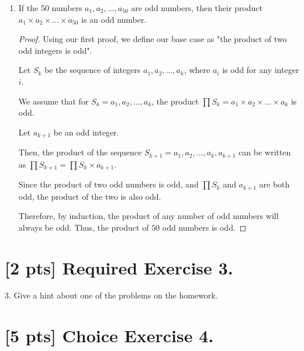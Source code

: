 \documentclass{article}
\begin{document}
\begin{enumerate}
{\begin{proof}
            Thus, \((a_1 \times a_2) \times (a_3 \times a_4)\) is odd.

            By the associative property of multiplication,
            \[a_1 \times a_2 \times ... \times a_4 = (a_1 \times a_2) \times (a_3 \times a_4), \]
            and therefore \(a_1 \times a_2 \times ... \times a_4 \) is odd.
        \end{proof}
    }

    \item {
        If the 50 numbers \(a_1, a_2, ..., a_50 \)
        are odd numbers, then their product \(a_1 \times a_2 \times ... \times a_50\)
        is an odd number.

        \begin{proof}
            Using our first proof, we define our base case as "the product of
            two odd integers is odd".

            Let \(S_k\) be the sequence of integers \(a_1, a_2, ..., a_k\), 
            where \(a_i\) is odd for any integer \(i\).
            
            We assume that for \(S_k = a_1, a_2, ..., a_k\), the product 
            \(\prod{S_k} = a_1 \times a_2 \times ... \times a_k\) is odd.

            Let \(a_{k+1}\) be an odd integer.

            Then, the product of the sequence \(S_{k+1} = a_1, a_2, ..., a_k, a_{k+1}\)
            can be written as \(\prod{S_{k+1}} = \prod{S_k} \times a_{k+1} \).

            Since the product of two odd numbers is odd, and \(\prod{S_k}\) and \(a_{k+1}\) 
            are both odd, the product of the two is also odd. 

            Therefore, by induction, the product of any number of odd numbers will 
            always be odd. Thus, the product of \(50\) odd numbers is odd.
        \end{proof}
    }
\end{enumerate}

\section*{[2 pts] Required Exercise 3.}

3. Give a hint about one of the problems on the homework.

\section*{[5 pts] Choice Exercise 4.}
\end{document}
